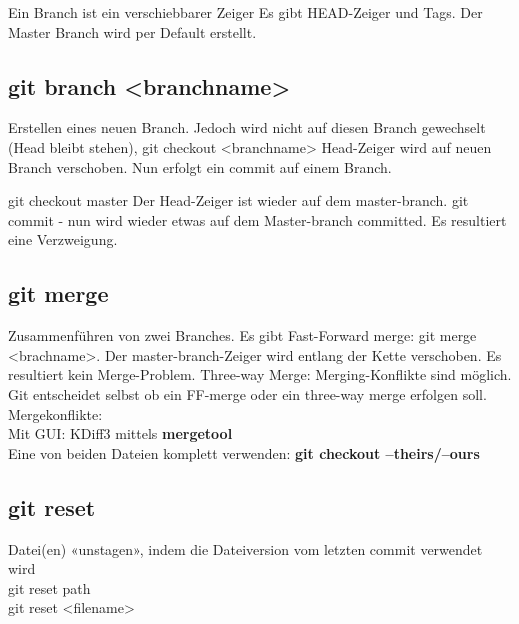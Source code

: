 Ein Branch ist ein verschiebbarer Zeiger
Es gibt HEAD-Zeiger und Tags.
Der Master Branch wird per Default erstellt.

\subsection{git branch <branchname>}
Erstellen eines neuen Branch.  Jedoch wird nicht auf diesen Branch gewechselt (Head bleibt stehen), 
git checkout <branchname> Head-Zeiger wird auf neuen Branch verschoben. 
Nun erfolgt ein commit auf einem Branch. 

git checkout master
Der Head-Zeiger ist wieder auf dem master-branch.
git commit - nun wird wieder etwas auf dem Master-branch committed. 
Es resultiert eine Verzweigung.

\subsection{git merge}
Zusammenführen von zwei Branches. Es gibt Fast-Forward merge: git merge <brachname>. Der master-branch-Zeiger wird entlang der Kette verschoben. Es resultiert kein Merge-Problem.
Three-way Merge: Merging-Konflikte sind möglich.
Git entscheidet selbst ob ein FF-merge oder ein three-way merge erfolgen soll.  \\
Mergekonflikte: \\
Mit GUI: KDiff3 mittels \textbf{mergetool} \\
Eine von beiden Dateien komplett verwenden: \textbf{git checkout \lbrack--theirs/--ours\rbrack}

\subsection{git reset}
Datei(en) «unstagen», indem die Dateiversion 
vom letzten commit verwendet wird \\
git reset path \\
git reset <filename>

